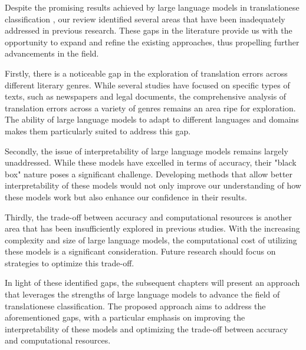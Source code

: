 Despite the promising results achieved by large language models in translationese classification \cite{xjsdhchuc3oiqwe}, our review identified several areas that have been inadequately addressed in previous research. These gaps in the literature provide us with the opportunity to expand and refine the existing approaches, thus propelling further advancements in the field.

Firstly, there is a noticeable gap in the exploration of translation errors across different literary genres. While several studies have focused on specific types of texts, such as newspapers and legal documents, the comprehensive analysis of translation errors across a variety of genres remains an area ripe for exploration. The ability of large language models to adapt to different languages and domains makes them particularly suited to address this gap.

Secondly, the issue of interpretability of large language models remains largely unaddressed. While these models have excelled in terms of accuracy, their "black box" nature poses a significant challenge. Developing methods that allow better interpretability of these models would not only improve our understanding of how these models work but also enhance our confidence in their results.

Thirdly, the trade-off between accuracy and computational resources is another area that has been insufficiently explored in previous studies. With the increasing complexity and size of large language models, the computational cost of utilizing these models is a significant consideration. Future research should focus on strategies to optimize this trade-off.

In light of these identified gaps, the subsequent chapters will present an approach that leverages the strengths of large language models to advance the field of translationese classification. The proposed approach aims to address the aforementioned gaps, with a particular emphasis on improving the interpretability of these models and optimizing the trade-off between accuracy and computational resources.



